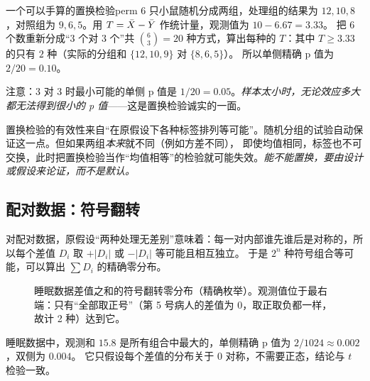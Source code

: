 \begin{example}{一个可以手算的置换检验}{perm}
6 只小鼠随机分成两组，处理组的结果为 $12,10,8$，对照组为 $9,6,5$。用 $T=\bar{X}-\bar{Y}$ 作统计量，观测值为 $10-6.67=3.33$。
把 $6$ 个数重新分成“3 个对 3 个”共 $\binom63=20$ 种方式，算出每种的 $T$：其中 $T\ge3.33$ 的只有 $2$ 种（实际的分组和 $\{12,10,9\}$ 对 $\{8,6,5\}$）。
所以单侧精确 p 值为 $2/20=0.10$。

注意：3 对 3 时最小可能的单侧 p 值是 $1/20=0.05$。\emph{样本太小时，无论效应多大都无法得到很小的 p 值}——这是置换检验诚实的一面。
\end{example}

\begin{intuition}[置换检验的合法性从哪里来]
置换检验的有效性来自“在原假设下各种标签排列等可能”。随机分组的试验自动保证这一点。但如果两组\emph{本来}就不同（例如方差不同），
即使均值相同，标签也不可交换，此时把置换检验当作“均值相等”的检验就可能失效。\emph{能不能置换，要由设计或假设来论证，而不是默认。}
\end{intuition}

\subsection{配对数据：符号翻转}

对配对数据，原假设“两种处理无差别”意味着：每一对内部谁先谁后是对称的，所以每个差值 $D_i$ 取 $+|D_i|$ 或 $-|D_i|$ 等可能且相互独立。
于是 $2^n$ 种符号组合等可能，可以算出 $\sum D_i$ 的精确零分布。

\begin{figure}[H]
\centering
{}
\caption{睡眠数据差值之和的符号翻转零分布（精确枚举）。观测值位于最右端：只有“全部取正号”（第 5 号病人的差值为 0，取正取负都一样，故计 2 种）达到它。}
\label{fig:flip}
\end{figure}

睡眠数据中，观测和 $15.8$ 是所有组合中最大的，单侧精确 p 值为 $2/1024\approx0.002$，双侧为 $0.004$。
它只假设每个差值的分布关于 $0$ 对称，不需要正态，结论与 $t$ 检验一致。

